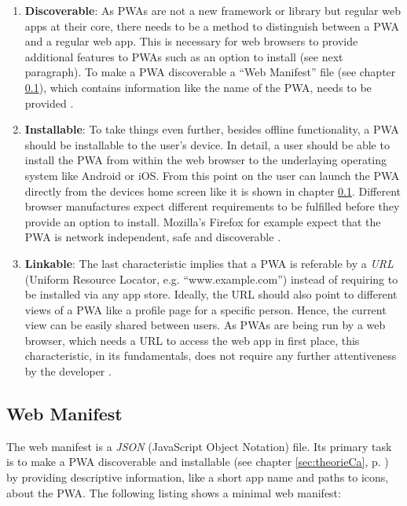 \begin{enumerate}
	\item \textbf{Discoverable}: As PWAs are not a new framework or library but regular web apps at their core, there needs to be a method to distinguish between a PWA and a regular web app. This is necessary for web browsers to provide additional features to PWAs such as an option to install (see next paragraph). To make a PWA discoverable a “Web Manifest” file (see chapter \ref{sec:theorieCb}), which contains information like the name of the PWA, needs to be provided \cite[p. 118]{liebelProgressiveWebApps2019}.

	\item \textbf{Installable}: To take things even further, besides offline functionality, a PWA should be installable to the user’s device. In detail, a user should be able to install the PWA from within the web browser to the underlaying operating system like Android or iOS. From this point on the user can launch the PWA directly from the devices home screen like it is shown in chapter \ref{sec:theorieCb}. Different browser manufactures expect different requirements to be fulfilled before they provide an option to install. Mozilla’s Firefox for example expect that the PWA is network independent, safe and discoverable \cite{HowMakePWAs}.

	\item \textbf{Linkable}: The last characteristic implies that a PWA is referable by a \textit{URL} (Uniform Resource Locator, e.g. “www.example.com”) instead of requiring to be installed via any app store. Ideally, the URL should also point to different views of a PWA like a profile page for a specific person. Hence, the current view can be easily shared between users. As PWAs are being run by a web browser, which needs a URL to access the web app in first place, this characteristic, in its fundamentals, does not require any further attentiveness by the developer \cite[pp. 126-127]{liebelProgressiveWebApps2019}.
\end{enumerate}

\subsection{Web Manifest}
\label{sec:theorieCb}

The web manifest is a \textit{JSON} (JavaScript Object Notation) file. Its primary task is to make a PWA discoverable and installable (see chapter \ref{sec:theorieCa}, p. \pageref{sec:theorieCa}) by providing descriptive information, like a short app name and paths to icons, about the PWA. 
The following listing shows a minimal web manifest:

